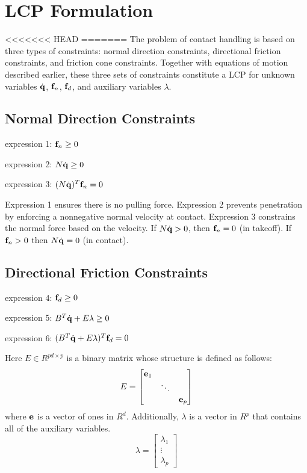\section{LCP Formulation}
<<<<<<< HEAD
=======
The problem of contact handling is based on three types of
constraints: normal direction constraints, directional friction constraints,
and friction cone constraints. Together with equations of
motion described earlier, these three sets of constraints constitute a
LCP for unknown variables $\dot{\mathbf{q}}$, $\mathbf{f}_n$, $\mathbf{f}_d$, and
auxiliary variables $\lambda$.

\subsection{Normal Direction Constraints}
\begin{packed_item}
\item{expression 1:} $\mathbf{f}_n \geq 0$
\item{expression 2:} $N \dot{\mathbf{q}} \geq 0$
\item{expression 3:} $(N \dot{\mathbf{q}})^T\mathbf{f}_n = 0$
\end{packed_item}
Expression 1 ensures there is no pulling force. Expression 2 prevents
penetration by enforcing a nonnegative normal velocity at
contact. Expression 3 constrains the normal force based on the
velocity. If $N \dot{\mathbf{q}} > 0$, then $\mathbf{f}_n = 0$ (in
takeoff). If $\mathbf{f}_n > 0$ then $N \dot{\mathbf{q}} = 0$ (in contact).

\subsection{Directional Friction Constraints}
\begin{packed_item}
\item{expression 4:} $\mathbf{f}_d \geq 0$
\item{expression 5:} $B^T\dot{\mathbf{q}} + E\lambda \geq 0$
\item{expression 6:} $(B^T\dot{\mathbf{q}} + E\lambda)^T\mathbf{f}_d = 0$
\end{packed_item}
Here $E \in R^{pd \times p}$ is a binary matrix whose structure is
defined as follows: 
\begin{equation}
\label{eq:ematrix}
E = \left[\begin{matrix}\mathbf{e}_1 & & \\  & \ddots & \\  & & \mathbf{e}_p \end{matrix}\right]
\end{equation}
where $\mathbf{e}$ is a vector of ones in
$R^d$. Additionally, $\lambda$ is a vector in $R^p$ that contains all
of the auxiliary variables.
\begin{equation}
\label{eq:lambda}
\lambda = \left[\begin{matrix}\lambda_1 \\  \vdots \\ \lambda_p\end{matrix}\right]
\end{equation}

